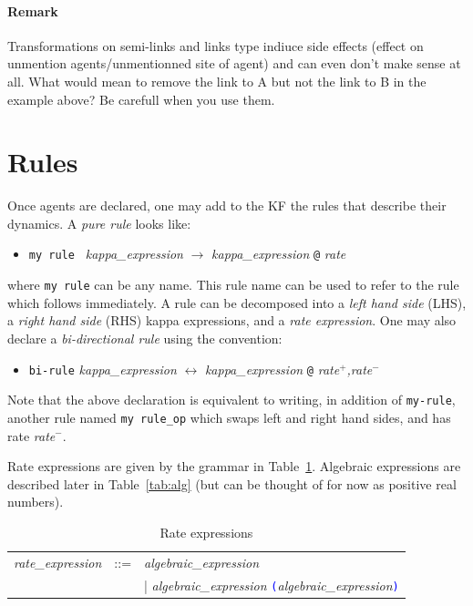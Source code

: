 \documentclass[11pt]{book}
\def\tcb#1{\textcolor{blue}{\ttt{#1}}}
\def\ttt#1{\texttt{#1}}
\def\var#1{{\textquotesingle}#1{\textquotesingle}}
\def\rar{\rightarrow}
\def\lrar{\leftrightarrow}
\def\ITE#1{\begin{itemize}#1\end{itemize}}
\def\imp#1{\emph{#1}\index{#1}}
\newcommand{\Remark}{\paragraph{Remark}}
\begin{document}
\Remark{Transformations on semi-links and links type indiuce side
  effects (effect on unmention agents/unmentionned site of agent) and
  can even don't make sense at all. What would mean to remove the link
  to A but not the link to B in the example above? Be carefull when
  you use them.}

\section{Rules}\label{sec:rules}

Once agents are declared, one may add to the KF the
rules that describe their dynamics. A \imp{pure rule}
looks like:

\ITE{
\item[] \ttt{{\textquotesingle}my rule{\textquotesingle} } {\it
  kappa\_expression} $\rar$ {\it kappa\_expression} \ttt{@} {\it rate}
}

where \ttt{{\textquotesingle}my rule{\textquotesingle}} can be any
name. This rule name can be used to refer to the rule which follows
immediately. A rule can be decomposed into a \emph{left hand
  side} (LHS), a \emph{right hand
  side} (RHS) kappa expressions, and a \emph{rate expression}. One may also
declare a \imp{bi-directional rule} using the convention:

\ITE{
\item[] \ttt{{\textquotesingle}bi-rule{\textquotesingle}} {\it kappa\_expression} $\lrar$ {\it kappa\_expression} \ttt{@} {\it rate$^+$,rate$^-$}
}

Note that the above declaration is equivalent to
writing, in addition of \ttt{\var{my-rule}}, another rule named
\ttt{\var{my rule\_op}} which swaps left and right hand sides, and has
rate \textit{rate$^-$}.

Rate expressions are given by the grammar in
Table~\ref{tab:rates}. Algebraic expressions are described later in Table~\ref{tab:alg} (but can be
thought of for now as positive real numbers).

\begin{table}[ht!]
  \centering
  \caption{Rate expressions}
  \begin{tabular}{@{} lcl @{}}
    \textit{rate\_expression} &::=& \textit{algebraic\_expression} \\
&&| \textit{algebraic\_expression} \tcb{(}\textit{algebraic\_expression}\tcb{)}
    \end{tabular}
  \label{tab:rates}
\end{table}
\end{document}

